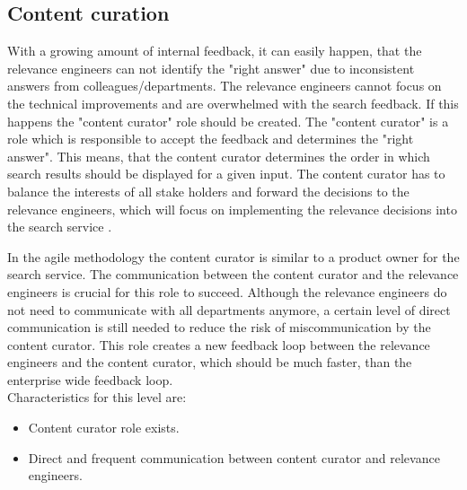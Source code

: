 \subsection{Content curation}
\label{ref:qa:orga:contentcuration}
With a growing amount of internal feedback, it can easily happen, 
that the relevance engineers can not identify the "right answer" due to inconsistent answers from colleagues/departments.
The relevance engineers cannot focus on the technical improvements and are overwhelmed with the search feedback.
If this happens the "content curator" role should be created. 
The "content curator" is a role which is responsible to accept the feedback and determines the "right answer".
This means, that the content curator determines the order in which search results should be displayed for a given input.
The content curator has to balance the interests of all stake holders and forward the decisions to the relevance engineers,
which will focus on implementing the relevance decisions into the search service \cite[see][P. 268]{relevant_search_2016}.\par
In the agile methodology the content curator is similar to a product owner for the search service.
The communication between the content curator and the relevance engineers is crucial for this role to succeed.
Although the relevance engineers do not need to communicate with all departments anymore,
a certain level of direct communication is still needed to reduce the risk of miscommunication by the content curator.
This role creates a new feedback loop between the relevance engineers and the content curator,
which should be much faster, than the enterprise wide feedback loop.\\
Characteristics for this level are:
\begin{itemize}
	\item Content curator role exists.
	\item Direct and frequent communication between content curator and relevance engineers.
\end{itemize}

